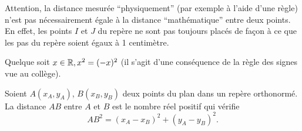 \documentclass[a4paper, 12pt]{report}
\begin{document}
\begin{rmq}
Attention, la distance mesurée ``physiquement'' (par exemple à l'aide d'une règle) n'est pas nécessairement égale à la distance ``mathématique'' entre deux points. En effet, les points $I$ et $J$ du repère ne sont pas toujours placés de façon à ce que les pas du repère soient égaux à 1 centimètre.
\end{rmq}

\begin{rapl}
Quelque soit $x \in \mathbb{R}, x^2 = (-x)^2$ (il s'agit d'une conséquence de la règle des signes vue au collège).
\end{rapl}

\begin{thm}[Distance]
	Soient $A(x_A, y_A)$, $B(x_B, y_B)$ deux points du plan dans un repère orthonormé.
	La distance $AB$ entre $A$ et $B$ est le nombre réel positif qui vérifie
		\[ AB^2 = (x_A - x_B)^2 + (y_A - y_B)^2 . \]
\end{thm}
\end{document}
